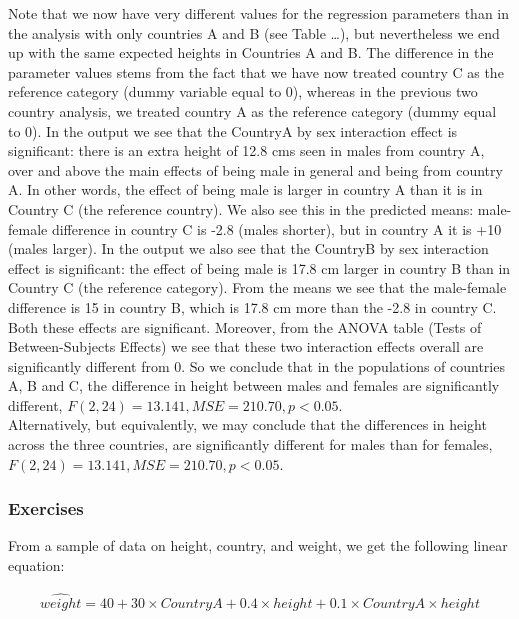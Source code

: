 \documentclass[]{report}\usepackage[]{graphicx}\usepackage[]{color}
\begin{document}
Note that we now have very different values for the regression parameters than in the analysis with only countries A and B (see Table \dots), but nevertheless we end up with the same expected heights in Countries A and B. The difference in the parameter values stems from the fact that we have now treated country C as the reference category (dummy variable equal to 0), whereas in the previous two country analysis, we treated country A as the reference category (dummy equal to 0). In the output we see that the CountryA by sex interaction effect is significant: there is an extra height of 12.8 cms seen in males from country A, over and above the main effects of being male in general and being from country A. In other words, the effect of being male is larger in country A than it is in Country C (the reference country). We also see this in the predicted means: male-female difference in country C is -2.8 (males shorter), but in country A it is +10 (males larger). In the output we also see that the CountryB by sex interaction effect is significant: the effect of being male is 17.8 cm larger in country B than in Country C (the reference category). From the means we see that the male-female difference is 15 in country B, which is 17.8 cm more than the -2.8 in country C. Both these effects are significant. Moreover, from the ANOVA table (Tests of Between-Subjects Effects) we see that these two interaction effects overall are significantly different from 0. So we conclude that in the populations of countries A, B and C, the difference in height between males and females are significantly different, $F(2,24)=13.141, MSE=210.70, p < 0.05$.\\
Alternatively, but equivalently, we may conclude that the differences in height across the three countries, are significantly different for males than for females, $F(2,24)=13.141, MSE=210.70, p < 0.05$.\\



\subsubsection{Exercises}

From a sample of data on height, country, and weight, we get the following linear equation:


\begin{eqnarray}
\widehat{weight}= 40 + 30 \times CountryA + 0.4\times height + 0.1 \times CountryA\times height \nonumber
\end{eqnarray}
\end{document}
